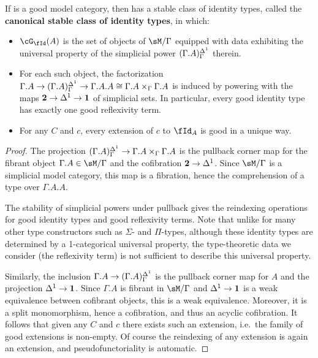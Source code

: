 \documentclass{amsart}
\let\Id\fId
\let\G\cG
\begin{document}
\begin{thm}\label{thm:stable-id}
  If \sM is a good model category, then \fibm has a stable class of identity types, called the \textbf{canonical stable class of identity types}, in which:
  \begin{itemize}
  \item $\G_\Id(A)$ is the set of objects of $\sM/\Gamma$ equipped with data exhibiting the universal property of the simplicial power $(\Gamma.A)^{\Delta^1}_\Gamma$ therein.
  \item For each such object, the factorization $\Gamma.A \to (\Gamma.A)^{\Delta^1}_\Gamma \to \Gamma.A.A \cong \Gamma.A \times_\Gamma \Gamma.A$ is induced by powering with the maps $\mathbf{2} \to {\Delta^1} \to \mathbf{1}$ of simplicial sets.
    In particular, every good identity type has exactly one good reflexivity term.
  \item For any $C$ and $c$, every extension of $c$ to $\Id_A$ is good in a unique way.
  \end{itemize}
\end{thm}
\begin{proof}
  The projection $(\Gamma.A)^{\Delta^1}_\Gamma \to \Gamma.A\times_\Gamma \Gamma.A$ is the pullback corner map for the fibrant object $\Gamma.A\in\sM/\Gamma$ and the cofibration $\mathbf{2}\to {\Delta^1}$.
  Since $\sM/\Gamma$ is a simplicial model category, this map is a fibration, hence the comprehension of a type over $\Gamma.A.A$.

  The stability of simplicial powers under pullback gives the reindexing operations for good identity types and good reflexivity terms.
  Note that unlike for many other type constructors such as $\Sigma$- and $\Pi$-types, although these identity types are determined by a 1-categorical universal property, the type-theoretic data we consider (the reflexivity term) is not sufficient to describe this universal property.

  Similarly, the inclusion $\Gamma.A\to (\Gamma.A)^{\Delta^1}_\Gamma$ is the pullback corner map for $A$ and the projection ${\Delta^1} \to \mathbf{1}$.
  Since $\Gamma.A$ is fibrant in $\sM/\Gamma$ and ${\Delta^1} \to \mathbf{1}$ is a weak equivalence between cofibrant objects, this is a weak equivalence.
  Moreover, it is a split monomorphism, hence a cofibration, and thus an acyclic cofibration.
  It follows that given any $C$ and $c$ there exists such an extension, i.e.\ the family of good extensions is non-empty.
  Of course the reindexing of any extension is again an extension, and pseudofunctoriality is automatic.
\end{proof}
\end{document}
